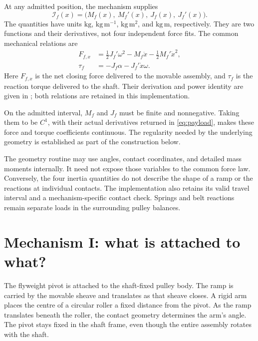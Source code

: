 \documentclass[11pt,letterpaper]{article}
\numberwithin{equation}{section}
\newcommand{\half}{\tfrac12}
\begin{document}
At any admitted position, the mechanism supplies
\begin{equation}
  \mathcal I_f(x)=\bigl(M_f(x),\ M_f'(x),\ J_f(x),\ J_f'(x)\bigr).
  \label{eq:payload}
\end{equation}
The quantities have units $\mathrm{kg}$, $\mathrm{kg\,m^{-1}}$, $\mathrm{kg\,m^2}$, and $\mathrm{kg\,m}$, respectively. They are two functions and their derivatives, not four independent force fits. The common mechanical relations are
\begin{align}
  F_{f,x}&=\half J_f'\omega^2-M_f\ddot x-\half M_f'\dot x^2,
       \label{eq:force}\\
  \tau_f&=-J_f\alpha-J_f'\dot x\omega.
       \label{eq:torque}
\end{align}
Here $F_{f,x}$ is the net closing force delivered to the movable assembly, and $\tau_f$ is the reaction torque delivered to the shaft. Their derivation and power identity are given in \cite{general}; both relations are retained in this implementation.

On the admitted interval, $M_f$ and $J_f$ must be finite and nonnegative. Taking them to be $C^1$, with their actual derivatives returned in \cref{eq:payload}, makes these force and torque coefficients continuous. The regularity needed by the underlying geometry is established as part of the construction below.

The geometry routine may use angles, contact coordinates, and detailed mass moments internally. It need not expose those variables to the common force law. Conversely, the four inertia quantities do not describe the shape of a ramp or the reactions at individual contacts. The implementation also retains its valid travel interval and a mechanism-specific contact check. Springs and belt reactions remain separate loads in the surrounding pulley balances.

\section{Mechanism I: what is attached to what?}
\label{sec:assembly}

The flyweight pivot is attached to the shaft-fixed pulley body. The ramp is carried by the movable sheave and translates as that sheave closes. A rigid arm places the centre of a circular roller a fixed distance from the pivot. As the ramp translates beneath the roller, the contact geometry determines the arm's angle. The pivot stays fixed in the shaft frame, even though the entire assembly rotates with the shaft.
\end{document}
